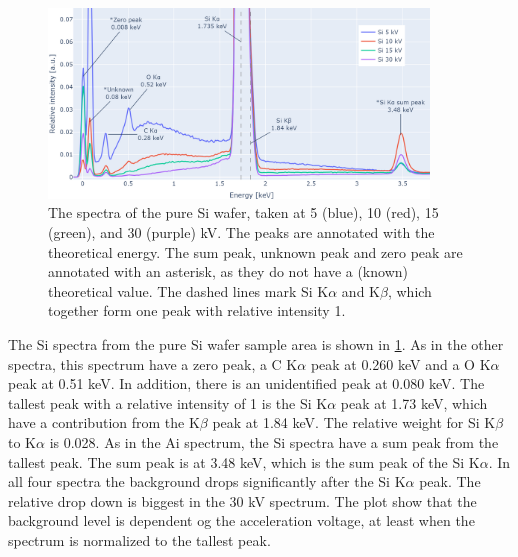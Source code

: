 \begin{figure}[h]
    \centering
    \includegraphics[width=0.90\textwidth]{figures/each_spectra/Si_everything.png}
    \caption{
        The spectra of the pure Si wafer, taken at 5 (blue), 10 (red), 15 (green), and 30 (purple) kV.
        The peaks are annotated with the theoretical energy.
        The sum peak, unknown peak and zero peak are annotated with an asterisk, as they do not have a (known) theoretical value.
        The dashed lines mark Si K$\alpha$ and K$\beta$, which together form one peak with relative intensity 1.
    }
    \label{fig:results:Spectra_Si}
\end{figure}

The Si spectra from the pure Si wafer sample area is shown in \cref{fig:results:Spectra_Si}.
As in the other spectra, this spectrum have a zero peak, a C K$\alpha$ peak at 0.260 keV and a O K$\alpha$ peak at 0.51 keV.
In addition, there is an unidentified peak at 0.080 keV.
The tallest peak with a relative intensity of 1 is the Si K$\alpha$ peak at 1.73 keV, which have a contribution from the K$\beta$ peak at 1.84 keV.
The relative weight for Si K$\beta$ to K$\alpha$ is 0.028.
As in the Ai spectrum, the Si spectra have a sum peak from the tallest peak.
The sum peak is at 3.48 keV, which is the sum peak of the Si K$\alpha$.
In all four spectra the background drops significantly after the Si K$\alpha$ peak.
The relative drop down is biggest in the 30 kV spectrum.
The plot show that the background level is dependent og the acceleration voltage, at least when the spectrum is normalized to the tallest peak.





